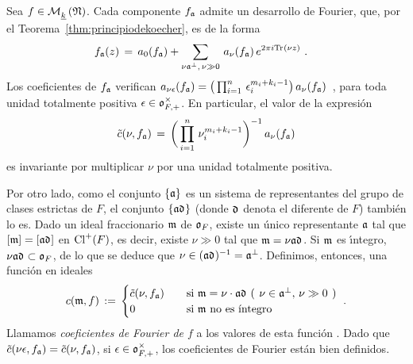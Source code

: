 Sea $f\in\modularH{k}{\frak{N}}$. Cada componente $f_{\frak{a}}$ admite un
desarrollo de Fourier, que, por el Teorema~\ref{thm:principiodekoecher}, es de
la forma
\begin{align*}
	f_{\frak{a}}(z) & \,=\,a_{0}(f_{\frak{a}})+
		\sum_{\nu\frak{a}^{\perp},\,\nu\gg 0}\,a_{\nu}(f_{\frak{a}})\,
			e^{2\pi i\traza(\nu z)}
	\text{ .}
\end{align*}
%
Los coeficientes de $f_{\frak{a}}$ verifican
\begin{math}
	a_{\nu\epsilon}(f_{\frak{a}})=
		\big(\prod_{i=1}^{n}\,\epsilon_{i}^{m_{i}+k_{i}-1}\big)\,
		a_{\nu}(f_{\frak{a}})
\end{math}~,
para toda unidad totalmente positiva $\epsilon\in\oka{F,+}^{\times}$. En
particular, el valor de la expresi\'{o}n
\begin{equation}
	\label{eq:coeficientesdefouriertilde}
	\tilde{c}(\nu,f_{\frak{a}}) \,=\,
		\bigg(\prod_{i=1}^{n}\,\nu_{i}^{m_{i}+k_{i}-1}\bigg)^{-1}\,
			a_{\nu}(f_{\frak{a}})
\end{equation}
%
es invariante por multiplicar $\nu$ por una unidad totalmente positiva.

Por otro lado, como el conjunto $\{\frak{a}\}$ es un sistema de representantes
del grupo de clases estrictas de $F$, el conjunto $\{\frak{a}\diferente\}$
(donde $\diferente$ denota el diferente de $F$) tambi\'{e}n lo es. Dado un
ideal fraccionario $\frak{m}$ de $\oka{F}$, existe un \'{u}nico representante
$\frak{a}$ tal que $[\frak{m}]=[\frak{a}\diferente]$ en $\pClass{F}$, es decir,
existe $\nu\gg 0$ tal que $\frak{m}=\nu\frak{a}\diferente$. Si $\frak{m}$ es
\'{\i}ntegro, $\nu\frak{a}\diferente\subset\oka{F}$, de lo que se deduce que
$\nu\in(\frak{a}\diferente)^{-1}=\frak{a}^{\perp}$. Definimos, entonces, una
funci\'{o}n en ideales
\begin{equation}
	\label{eq:coeficientesdefourierformamodular}
	c(\frak{m},f) \,:=\,
		\begin{cases}
			\tilde{c}(\nu,f_{\frak{a}}) & \quad\text{si }
					\frak{m}=\nu\cdot\frak{a}\diferente
					\text{ (\phantom)}
					\nu\in\frak{a}^{\perp},\,\nu\gg 0
					\text{\phantom()} \\
			0 & \quad\text{si }\frak{m}\text{ no es \'{\i}ntegro}
		\end{cases}
	\text{ .}
\end{equation}
%
Llamamos \emph{coeficientes de Fourier de $f$} a los valores de esta
funci\'{o}n \cite{ShimuraSpecialValuesOfZeta}.
Dado que $\tilde{c}(\nu\epsilon,f_{\frak{a}})=\tilde{c}(\nu,f_{\frak{a}})$,
si $\epsilon\in\oka{F,+}^{\times}$, los coeficientes de Fourier est\'{a}n bien
definidos.
